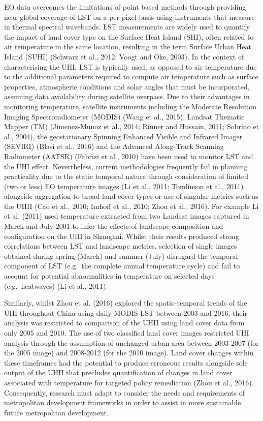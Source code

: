\documentclass[]{book}
\begin{document}
EO data overcomes the limitations of point based methods through
providing near global coverage of LST on a per pixel basis using
instruments that measure in thermal spectral wavebands. LST measurements
are widely used to quantify the impact of land cover type on the Surface
Heat Island (SHI), often related to air temperature in the same
location, resulting in the term Surface Urban Heat Island (SUHI)
(Schwarz et al., 2012; Voogt and Oke, 2003). In the context of
characterising the UHI, LST is typically used, as opposed to air
temperature due to the additional parameters required to compute air
temperature such as surface properties, atmospheric conditions and solar
angles that must be incorporated, assuming data availability during
satellite overpass. Due to their advantages in monitoring temperature,
satellite instruments including the Moderate Resolution Imaging
Spectroradiometer (MODIS) (Wang et al., 2015), Landsat Thematic Mapper
(TM) (Jimenez-Munoz et al., 2014; Rinner and Hussain, 2011; Sobrino et
al., 2004), the geostationary Spinning Enhanced Visible and Infrared
Imager (SEVIRI) (Blasi et al., 2016) and the Advanced Along-Track
Scanning Radiometer (AATSR) (Fabrizi et al., 2010) have been used to
monitor LST and the UHI effect. Nevertheless, current methodologies
frequently fail in planning practicality due to the static temporal
nature through consideration of limited (two or less) EO temperature
images (Li et al., 2011; Tomlinson et al., 2011) alongside aggregation
to broad land cover types or use of singular metrics such as the UHII
(Cao et al., 2010; Imhoff et al., 2010; Zhou et al., 2016). For example
Li et al. (2011) used temperature extracted from two Landsat images
captured in March and July 2001 to infer the effects of landscape
composition and configuration on the UHI in Shanghai. Whilst their
results produced strong correlations between LST and landscape metrics,
selection of single images obtained during spring (March) and summer
(July) disregard the temporal component of LST (e.g.~the complete annual
temperature cycle) and fail to account for potential abnormalities in
temperature on selected days (e.g.~heatwaves) (Li et al., 2011).

Similarly, whilst Zhou et al. (2016) explored the spatio-temporal trends
of the UHI throughout China using daily MODIS LST between 2003 and 2016,
their analysis was restricted to comparison of the UHII using land cover
data from only 2005 and 2010. The use of two classified land cover
images restricted UHI analysis through the assumption of unchanged urban
area between 2003-2007 (for the 2005 image) and 2008-2012 (for the 2010
image). Land cover changes within these timeframes had the potential to
produce erroneous results alongside sole output of the UHII that
precludes quantification of changes in land cover associated with
temperature for targeted policy remediation (Zhou et al., 2016).
Consequently, research must adapt to consider the needs and requirements
of metropolitan development frameworks in order to assist in more
sustainable future metropolitan development.
\end{document}
